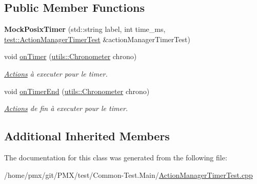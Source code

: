 \subsection*{Public Member Functions}
\begin{DoxyCompactItemize}
\item 
\mbox{\label{classMockPosixTimer_a7bc49c094c0ac155403ceefff35914c5}} 
{\bfseries Mock\+Posix\+Timer} (std\+::string label, int time\+\_\+ms, \hyperlink{classtest_1_1ActionManagerTimerTest}{test\+::\+Action\+Manager\+Timer\+Test} \&action\+Manager\+Timer\+Test)
\item 
\mbox{\label{classMockPosixTimer_aa603c75c81bc9d11ac113c8804709ced}} 
void \hyperlink{classMockPosixTimer_aa603c75c81bc9d11ac113c8804709ced}{on\+Timer} (\hyperlink{classutils_1_1Chronometer}{utils\+::\+Chronometer} chrono)
\begin{DoxyCompactList}\small\item\em \hyperlink{classActions}{Actions} à executer pour le timer. \end{DoxyCompactList}\item 
\mbox{\label{classMockPosixTimer_a252e0236bd9baaed52df865e86a1dc64}} 
void \hyperlink{classMockPosixTimer_a252e0236bd9baaed52df865e86a1dc64}{on\+Timer\+End} (\hyperlink{classutils_1_1Chronometer}{utils\+::\+Chronometer} chrono)
\begin{DoxyCompactList}\small\item\em \hyperlink{classActions}{Actions} de fin à executer pour le timer. \end{DoxyCompactList}\end{DoxyCompactItemize}
\subsection*{Additional Inherited Members}


The documentation for this class was generated from the following file\+:\begin{DoxyCompactItemize}
\item 
/home/pmx/git/\+P\+M\+X/test/\+Common-\/\+Test.\+Main/\hyperlink{ActionManagerTimerTest_8cpp}{Action\+Manager\+Timer\+Test.\+cpp}\end{DoxyCompactItemize}

